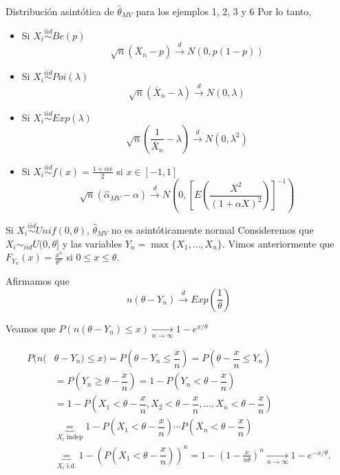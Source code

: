 \documentclass{beamer}
\theoremstyle{definition}
\newcommand{\ton}{\underset{n\to\infty}{\longrightarrow}}
\newcommand{\cw}{\overset{d}{\rightarrow}}
\begin{document}
\begin{frame}{\color{rosee}Distribuci\'on asint\'otica de $\widehat{\theta}_{MV}$ para los ejemplos 1, 2, 3 y 6}
Por lo tanto, 
\begin{itemize}
    \item Si $X_i\stackrel{iid}{\sim}Be(p)$
\[\sqrt{n}\left(\overline{X}_n-p\right)\cw N\left(0,p(1-p)\right)\]
\item Si $X_i\stackrel{iid}{\sim}Poi(\lambda)$
\[\sqrt{n}\left(\overline{X}_n-\lambda\right)\cw N\left(0,\lambda\right)\]
\item Si $X_i\stackrel{iid}{\sim}Exp(\lambda)$
\[\sqrt{n}\left(\frac{1}{\overline{X}_n}-\lambda\right)\cw N\left(0,\lambda^2\right)\]
\item Si $X_i\stackrel{iid}{\sim}f(x)=\frac{1+\alpha x}{2}$ si $x\in[-1,1]$
\[\sqrt{n}\left(\widehat{\alpha}_{MV}-\alpha\right)\cw N\left(0,\left[E\left(\frac{X^2}{(1+\alpha X)^2}\right)\right]^{-1}\right)\]
\end{itemize}
\end{frame}

\begin{frame}{\color{rosee}Si $X_i\stackrel{iid}{\sim}Unif(0,\theta)$, $\widehat{\theta}_{MV}$ no es asint\'oticamente normal}\small
 Consideremos que $X_i\sim_{iid}U(0,\theta]$ y las variables $Y_n=\max\{X_1,\dots, X_n\}$. Vimos anteriormente que $F_{Y_n}(x)=\frac{x^n}{\theta^n}$ si $0\leq x\leq \theta$.
 
 Afirmamos que \[n(\theta-Y_n)\cw Exp\left(\frac{1}{\theta}\right)\]
 
 Veamos que $P(n(\theta-Y_n)\leq x)\ton 1-e^{x/\theta}$
 
 \begin{align*}
     P(n(&\theta-Y_n)\leq x)=P\left(\theta-Y_n\leq \dfrac{x}{n}\right)=P\left(\theta-\dfrac{x}{n}\leq Y_n\right)\\
     &=P\left(Y_n\geq \theta-\dfrac{x}{n}\right)=1-P\left(Y_n< \theta-\dfrac{x}{n}\right)\\
     &=1-P\left(X_1<\theta-\dfrac{x}{n},X_2<\theta-\dfrac{x}{n}, \dots, X_n<\theta-\dfrac{x}{n}\right)\\
     &\underbrace{=}_{X_i \text{ indep}}1-P\left(X_1<\theta-\dfrac{x}{n}\right)\cdots P\left(X_n<\theta-\dfrac{x}{n}\right)\\
     &\underbrace{=}_{X_i \text{ i.d.}}1-\left(P\left(X_1<\theta-\dfrac{x}{n}\right)\right)^n=1-\left(1-\frac{x}{n\theta}\right)^{n}\ton 1-e^{-x/\theta}.
 \end{align*}
\end{frame}
\end{document}

